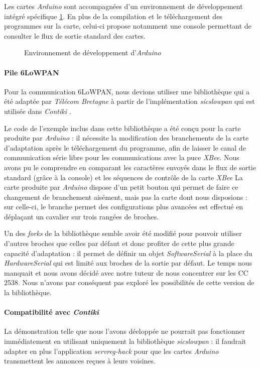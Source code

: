 Les cartes \emph{Arduino} sont accompagnées d’un environnement de développement intégré spécifique \cref{arduino-ide}.
En plus de la compilation et le téléchargement des programmes sur la carte, celui-ci propose notamment une console permettant de consulter le flux de sortie standard des cartes.

\begin{figure}[H]
\centering
{}
\caption{Environnement de développement d’\emph{Arduino}}
\label{arduino-ide}
\end{figure}

\paragraph{Pile 6LoWPAN}

Pour la communication 6LoWPAN, nous devions utiliser une bibliothèque qui a été adaptée par \emph{Télécom Bretagne} à partir de l’implémentation \emph{sicslowpan} qui est utilisée dans \emph{Contiki} .

Le code de l’exemple inclus dans cette bibliothèque a été conçu pour la carte produite par \emph{Arduino} : il nécessite la modification des branchements de la carte d’adaptation après le téléchargement du programme, afin de laisser le canal de communication série libre pour les communications avec la puce \emph{XBee}.
Nous avons pu le comprendre en comparant les caractères envoyés dans le flux de sortie standard (grâce à la console) et les séquences de contrôle de la carte \emph{XBee}
La carte produite par \emph{Arduino} dispose d’un petit bouton qui permet de faire ce changement de branchement aisément, mais pas la carte dont nous disposions : sur celle-ci, le branche permet des configurations plus avancées est effectué en déplaçant un cavalier sur trois rangées de broches.

Un des \textit{forks} de la bibliothèque  semble avoir été modifié pour pouvoir utiliser d’autres broches que celles par défaut et donc profiter de cette plus grande capacité d’adaptation : il permet de définir un objet \textit{SoftwareSerial} à la place du \textit{HardwareSerial} qui est limité aux broches de la sortie par défaut.
Le temps nous manquait et nous avons décidé avec notre tuteur de nous concentrer sur les CC 2538.
Nous n’avons par conséquent pas exploré les possibilités de cette version de la bibliothèque.

\paragraph{Compatibilité avec \emph{Contiki}}

La démonstration telle que nous l’avons déeloppée ne pourrait pas fonctionner immédiatement en utilisant uniquement la bibliothèque \emph{sicslowpan} : il faudrait adapter en plus l’application \textit{servreg-hack} pour que les cartes \emph{Arduino} transmettent les annonces reçues à leurs voisines.
